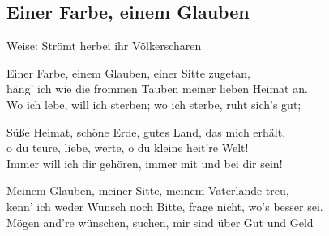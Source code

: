 
\subsection*{Einer Farbe, einem Glauben}
%
%

\hfill%
Weise: Strömt herbei ihr Völkerscharen%


\thestrophe Einer Farbe, einem Glauben, einer Sitte zugetan, \\
häng' ich wie die frommen Tauben meiner lieben Heimat an. \\
Wo ich lebe, will ich sterben; wo ich sterbe, ruht sich's gut; \\

\thestrophe Süße Heimat, schöne Erde, gutes Land, das mich erhält, \\
o du teure, liebe, werte, o du kleine heit're Welt! \\
Immer will ich dir gehören, immer mit und bei dir sein! \\

\thestrophe Meinem Glauben, meiner Sitte, meinem Vaterlande treu, \\
kenn' ich weder Wunsch noch Bitte, frage nicht, wo's besser sei. \\
Mögen and're wünschen, suchen, mir sind über Gut und Geld \\
